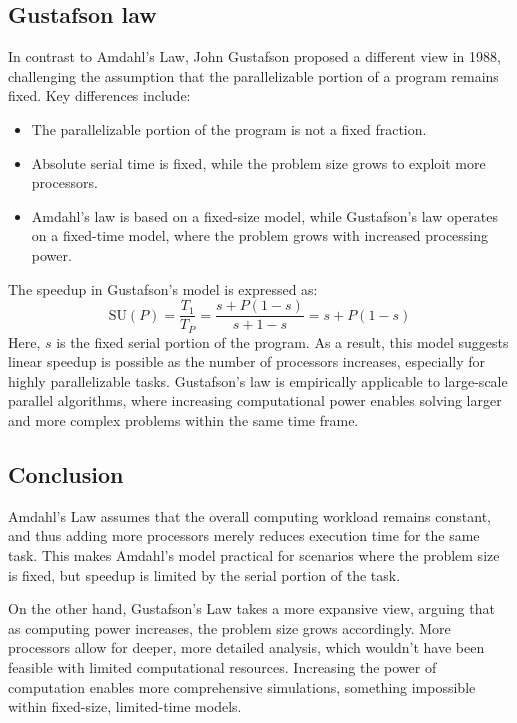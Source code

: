 \subsection{Gustafson law}
In contrast to Amdahl's Law, John Gustafson proposed a different view in 1988, challenging the assumption that the parallelizable portion of a program remains fixed. 
Key differences include:
\begin{itemize}
    \item The parallelizable portion of the program is not a fixed fraction.
    \item Absolute serial time is fixed, while the problem size grows to exploit more processors.
    \item Amdahl's law is based on a fixed-size model, while Gustafson's law operates on a fixed-time model, where the problem grows with increased processing power.
\end{itemize}
The speedup in Gustafson's model is expressed as:
\[\text{SU}(P)=\dfrac{T_1}{T_P}=\dfrac{s+P(1-s)}{s+1-s}=s+P(1-s)\]
Here, $s$ is the fixed serial portion of the program.
As a result, this model suggests linear speedup is possible as the number of processors increases, especially for highly parallelizable tasks. 
Gustafson's law is empirically applicable to large-scale parallel algorithms, where increasing computational power enables solving larger and more complex problems within the same time frame.

\subsection{Conclusion}
Amdahl's Law assumes that the overall computing workload remains constant, and thus adding more processors merely reduces execution time for the same task. 
This makes Amdahl's model practical for scenarios where the problem size is fixed, but speedup is limited by the serial portion of the task.

On the other hand, Gustafson's Law takes a more expansive view, arguing that as computing power increases, the problem size grows accordingly. 
More processors allow for deeper, more detailed analysis, which wouldn't have been feasible with limited computational resources.
Increasing the power of computation enables more comprehensive simulations, something impossible within fixed-size, limited-time models.